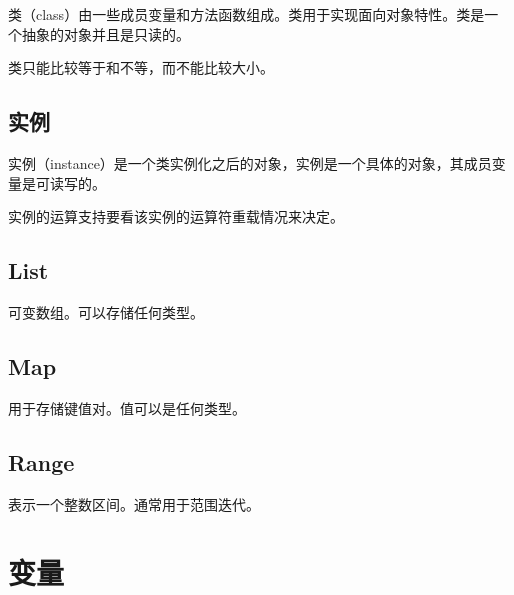 类（class）由一些成员变量和方法函数组成。类用于实现面向对象特性。类是一个抽象的对象并且是只读的。

类只能比较等于和不等，而不能比较大小。

\subsection{实例}

实例（instance）是一个类实例化之后的对象，实例是一个具体的对象，其成员变量是可读写的。

实例的运算支持要看该实例的运算符重载情况来决定。

\subsection{List}

可变数组。可以存储任何类型。

\subsection{Map}

用于存储键值对。值可以是任何类型。

\subsection{Range}

表示一个整数区间。通常用于范围迭代。

\section{变量}
